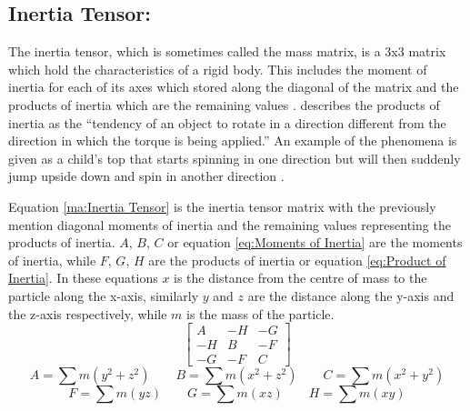 \subsection{Inertia Tensor:}\label{sc:IT}
The inertia tensor, which is sometimes called the mass matrix, is a 3x3 matrix which hold the characteristics of a rigid body.
This includes the moment of inertia for each of its axes which stored along the diagonal of the matrix and the products of inertia which are the remaining values \citep{millington2007game}.
\citet{millington2007game} describes the products of inertia as the “tendency of an object to rotate in a direction
different from the direction in which the torque is being applied.”
An example of the phenomena is given as a child's top that starts spinning in one direction but will then suddenly jump upside down and spin in another direction \citep{millington2007game}. 

Equation \ref{ma:Inertia Tensor} is the inertia tensor matrix with the previously mention diagonal moments of inertia and the remaining values representing the products of inertia.
$A$, $B$, $C$ or equation \ref{eq:Moments of Inertia} are the moments of inertia, while $F$, $G$, $H$ are the products of inertia or equation \ref{eq:Product of Inertia}.
In these equations $x$ is the distance from the centre of mass to the particle along the x-axis, similarly $y$ and $z$ are the distance along the y-axis and the z-axis respectively, while $m$ is the mass of the particle.
\begin{equation}\label{ma:Inertia Tensor}
	\begin{bmatrix}
	  A & -H & -G \\
	  -H & B & -F \\
	  -G & -F & C
	\end{bmatrix}
\end{equation}
\begin{equation}\label{eq:Moments of Inertia}
	A=\sum m\left({y}^{2}+{z}^{2}\right)
	\qquad
	B=\sum m\left({x}^{2}+{z}^{2}\right)
	\qquad
	C=\sum m\left({x}^{2}+{y}^{2}\right)
\end{equation}
\begin{equation}\label{eq:Product of Inertia}
	F=\sum m\left(yz\right)
	\qquad
	G=\sum m\left(xz\right)
	\qquad
	H=\sum m\left(xy\right)
\end{equation}

